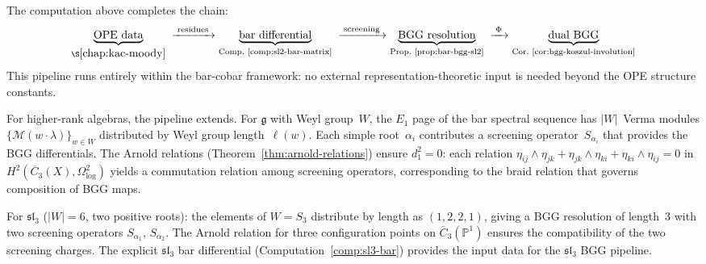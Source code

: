 \begin{remark}
\label{rem:bgg-pipeline}

The computation above completes the chain:
\[
\underbrace{\text{OPE data}}_{\S\ref{chap:kac-moody}}
\;\xrightarrow{\;\text{residues}\;}
\underbrace{\text{bar differential}}_{\text{Comp.~\ref{comp:sl2-bar-matrix}}}
\;\xrightarrow{\;\text{screening}\;}
\underbrace{\text{BGG resolution}}_{\text{Prop.~\ref{prop:bar-bgg-sl2}}}
\;\xrightarrow{\;\Phi\;}
\underbrace{\text{dual BGG}}_{\text{Cor.~\ref{cor:bgg-koszul-involution}}}
\]
This pipeline runs entirely within the bar-cobar
framework: no external representation-theoretic input
is needed beyond the OPE structure constants.

For higher-rank algebras, the pipeline extends.
For $\mathfrak{g}$ with Weyl group~$W$, the $E_1$ page
of the bar spectral sequence has
$|W|$~Verma modules
$\{\mathcal{M}(w \cdot \lambda)\}_{w \in W}$
distributed by Weyl group length~$\ell(w)$.
Each simple root~$\alpha_i$ contributes a screening
operator~$S_{\alpha_i}$ that provides the BGG
differentials.  The Arnold relations
(Theorem~\ref{thm:arnold-relations}) ensure
$d_1^2 = 0$: each relation
$\eta_{ij} \wedge \eta_{jk} + \eta_{jk} \wedge \eta_{ki}
+ \eta_{ki} \wedge \eta_{ij} = 0$
in $H^2(\overline{C}_3(X), \Omega^2_{\log})$ yields a
commutation relation among screening operators,
corresponding to the braid relation that
governs composition of BGG maps.

For $\mathfrak{sl}_3$ ($|W| = 6$, two positive roots):
the elements of $W = S_3$ distribute by length as
$(1, 2, 2, 1)$, giving a BGG resolution of length~$3$
with two screening operators $S_{\alpha_1}$,
$S_{\alpha_2}$.  The Arnold relation for three
configuration points on $\overline{C}_3(\mathbb{P}^1)$
ensures the compatibility of the two screening charges.
The explicit $\mathfrak{sl}_3$ bar differential
(Computation~\ref{comp:sl3-bar})
provides the input data for the $\mathfrak{sl}_3$
BGG pipeline.
\end{remark}

